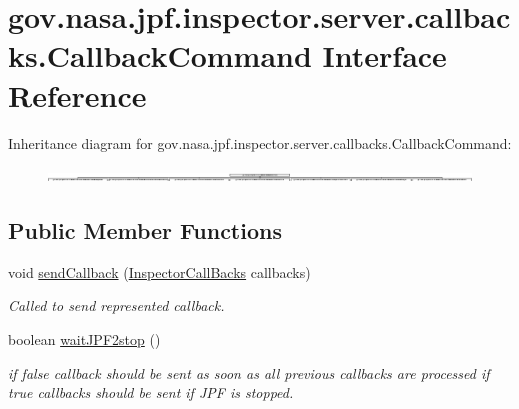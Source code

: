 \hypertarget{interfacegov_1_1nasa_1_1jpf_1_1inspector_1_1server_1_1callbacks_1_1_callback_command}{}\section{gov.\+nasa.\+jpf.\+inspector.\+server.\+callbacks.\+Callback\+Command Interface Reference}
\label{interfacegov_1_1nasa_1_1jpf_1_1inspector_1_1server_1_1callbacks_1_1_callback_command}
Inheritance diagram for gov.\+nasa.\+jpf.\+inspector.\+server.\+callbacks.\+Callback\+Command\+:\begin{figure}[H]
\begin{center}
\leavevmode
\includegraphics[height=0.277296cm]{interfacegov_1_1nasa_1_1jpf_1_1inspector_1_1server_1_1callbacks_1_1_callback_command}
\end{center}
\end{figure}
\subsection*{Public Member Functions}
\begin{DoxyCompactItemize}
\item 
void \hyperlink{interfacegov_1_1nasa_1_1jpf_1_1inspector_1_1server_1_1callbacks_1_1_callback_command_ae4cee95135293dd8c53e04fd7145b67f}{send\+Callback} (\hyperlink{interfacegov_1_1nasa_1_1jpf_1_1inspector_1_1interfaces_1_1_inspector_call_backs}{Inspector\+Call\+Backs} callbacks)
\begin{DoxyCompactList}\small\item\em Called to send represented callback. \end{DoxyCompactList}\item 
boolean \hyperlink{interfacegov_1_1nasa_1_1jpf_1_1inspector_1_1server_1_1callbacks_1_1_callback_command_a156477000bc705d78978af529e60fc5a}{wait\+J\+P\+F2stop} ()
\begin{DoxyCompactList}\small\item\em if false callback should be sent as soon as all previous callbacks are processed if true callbacks should be sent if J\+PF is stopped. \end{DoxyCompactList}\end{DoxyCompactItemize}


